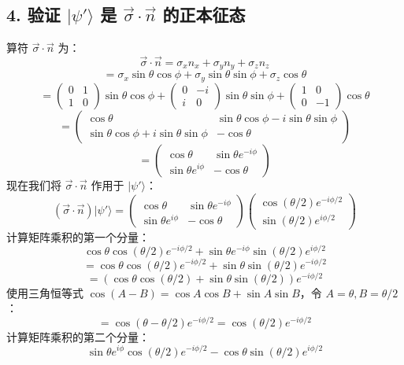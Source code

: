 \documentclass{article}
\begin{document}
\subsection*{4. 验证 \(|\psi'\rangle\) 是 \(\vec{\sigma} \cdot \vec{n}\) 的正本征态}
算符 \(\vec{\sigma} \cdot \vec{n}\) 为：
\[ \vec{\sigma} \cdot \vec{n} = \sigma_x n_x + \sigma_y n_y + \sigma_z n_z \]
\[ = \sigma_x \sin\theta\cos\phi + \sigma_y \sin\theta\sin\phi + \sigma_z \cos\theta \]
\[ = \begin{pmatrix} 0 & 1 \\ 1 & 0 \end{pmatrix} \sin\theta\cos\phi + \begin{pmatrix} 0 & -i \\ i & 0 \end{pmatrix} \sin\theta\sin\phi + \begin{pmatrix} 1 & 0 \\ 0 & -1 \end{pmatrix} \cos\theta \]
\[ = \begin{pmatrix} \cos\theta & \sin\theta\cos\phi - i\sin\theta\sin\phi \\ \sin\theta\cos\phi + i\sin\theta\sin\phi & -\cos\theta \end{pmatrix} \]
\[ = \begin{pmatrix} \cos\theta & \sin\theta e^{-i\phi} \\ \sin\theta e^{i\phi} & -\cos\theta \end{pmatrix} \]
现在我们将 \(\vec{\sigma} \cdot \vec{n}\) 作用于 \(|\psi'\rangle\)：
\[ (\vec{\sigma} \cdot \vec{n}) |\psi'\rangle = \begin{pmatrix} \cos\theta & \sin\theta e^{-i\phi} \\ \sin\theta e^{i\phi} & -\cos\theta \end{pmatrix} \begin{pmatrix} \cos(\theta/2)e^{-i\phi/2} \\ \sin(\theta/2)e^{i\phi/2} \end{pmatrix} \]
计算矩阵乘积的第一个分量：
\[ \cos\theta \cos(\theta/2)e^{-i\phi/2} + \sin\theta e^{-i\phi} \sin(\theta/2)e^{i\phi/2} \]
\[ = \cos\theta \cos(\theta/2)e^{-i\phi/2} + \sin\theta \sin(\theta/2)e^{-i\phi/2} \]
\[ = (\cos\theta \cos(\theta/2) + \sin\theta \sin(\theta/2))e^{-i\phi/2} \]
使用三角恒等式 \(\cos(A-B) = \cos A \cos B + \sin A \sin B\)，令 \(A=\theta, B=\theta/2\)：
\[ = \cos(\theta - \theta/2)e^{-i\phi/2} = \cos(\theta/2)e^{-i\phi/2} \]
计算矩阵乘积的第二个分量：
\[ \sin\theta e^{i\phi} \cos(\theta/2)e^{-i\phi/2} - \cos\theta \sin(\theta/2)e^{i\phi/2} \]
\end{document}
